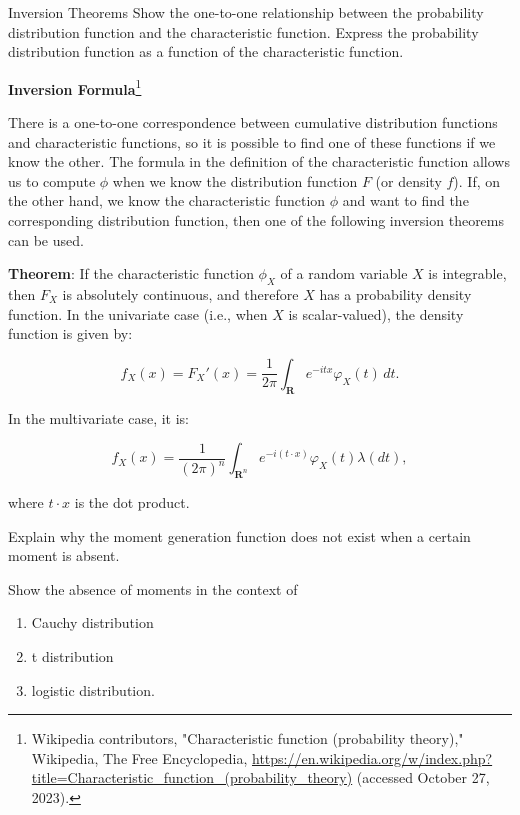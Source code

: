\documentclass[UTF8,a4paper,10pt]{article}
\begin{document}







\begin{Problem}[]{Inversion Theorems}
  Show the one-to-one relationship between the probability distribution function and the characteristic function. Express the probability distribution function as a function of the characteristic function.

\end{Problem}

\textbf{Inversion Formula}\footnote{Wikipedia contributors, "Characteristic function (probability theory)," Wikipedia, The Free Encyclopedia, \url{https://en.wikipedia.org/w/index.php?title=Characteristic_function_(probability_theory)} (accessed October 27, 2023).}

There is a one-to-one correspondence between cumulative distribution functions and characteristic functions, so it is possible to find one of these functions if we know the other. The formula in the definition of the characteristic function allows us to compute $\phi$ when we know the distribution function $F$ (or density $f$). If, on the other hand, we know the characteristic function $\phi$ and want to find the corresponding distribution function, then one of the following inversion theorems can be used.

\textbf{Theorem}: If the characteristic function $\phi_X$ of a random variable $X$ is integrable, then $F_X$ is absolutely continuous, and therefore $X$ has a probability density function. In the univariate case (i.e., when $X$ is scalar-valued), the density function is given by:

\[
f_{X}(x)=F_{X}'(x)=\frac{1}{2\pi}\int_{\mathbf{R}}e^{-itx}\varphi_{X}(t)\,dt.
\]

In the multivariate case, it is:

\[
f_{X}(x)=\frac{1}{(2\pi)^{n}}\int_{\mathbf{R}^{n}}e^{-i(t\cdot x)}\varphi_{X}(t)\lambda (dt),
\]

where $t\cdot x$ is the dot product.


\pagebreak

\begin{Problem}[]{}
  Explain why the moment generation function does not exist when a certain moment is absent. 
  
  Show the absence of moments in the context of 
  \begin{enumerate}
    \item Cauchy distribution
    \item t distribution
    \item logistic distribution.
  \end{enumerate}


\end{Problem}
\end{document}
